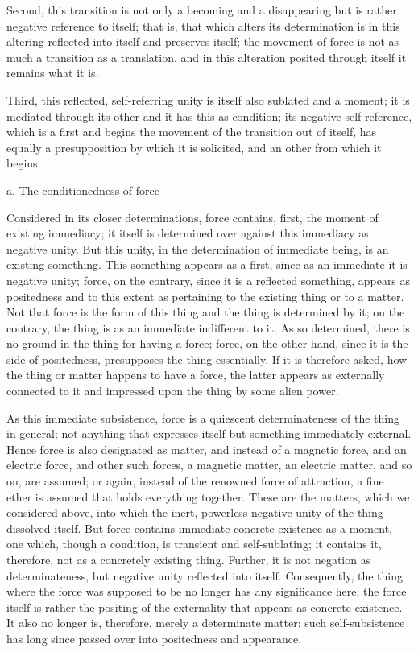 Second, this transition is not only
a becoming and a disappearing
but is rather negative reference to itself;
that is, that which alters its determination is
in this altering reflected-into-itself and preserves itself;
the movement of force is not
as much a transition as a translation,
and in this alteration posited through itself
it remains what it is.

Third, this reflected, self-referring unity is
itself also sublated and a moment;
it is mediated through its other
and it has this as condition;
its negative self-reference,
which is a first
and begins the movement of
the transition out of itself,
has equally a presupposition
by which it is solicited,
and an other from which it begins.

a. The conditionedness of force

Considered in its closer determinations,
force contains, first, the moment of existing immediacy;
it itself is determined over against this immediacy
as negative unity.
But this unity,
in the determination of immediate being,
is an existing something.
This something appears as a first, since as an
immediate it is negative unity;
force, on the contrary,
since it is a reflected something,
appears as positedness
and to this extent as pertaining to
the existing thing or to a matter.
Not that force is the form of this thing
and the thing is determined by it;
on the contrary, the thing is as
an immediate indifferent to it.
As so determined, there is no ground in
the thing for having a force;
force, on the other hand,
since it is the side of positedness,
presupposes the thing essentially.
If it is therefore asked,
how the thing or matter happens to have a force,
the latter appears as externally connected to it
and impressed upon the thing by some alien power.

As this immediate subsistence,
force is a quiescent determinateness of
the thing in general;
not anything that expresses itself
but something immediately external.
Hence force is also designated as matter,
and instead of a magnetic force,
and an electric force,
and other such forces,
a magnetic matter,
an electric matter,
and so on, are assumed;
or again, instead of
the renowned force of attraction,
a fine ether is assumed
that holds everything together.
These are the matters,
which we considered above,
into which the inert, powerless
negative unity of the thing dissolved itself.
But force contains immediate
concrete existence as a moment,
one which, though a condition,
is transient and self-sublating;
it contains it, therefore,
not as a concretely existing thing.
Further, it is not negation as determinateness,
but negative unity reflected into itself.
Consequently, the thing where the force was
supposed to be no longer has any significance here;
the force itself is rather
the positing of the externality
that appears as concrete existence.
It also no longer is, therefore,
merely a determinate matter;
such self-subsistence has long since passed over
into positedness and appearance.

